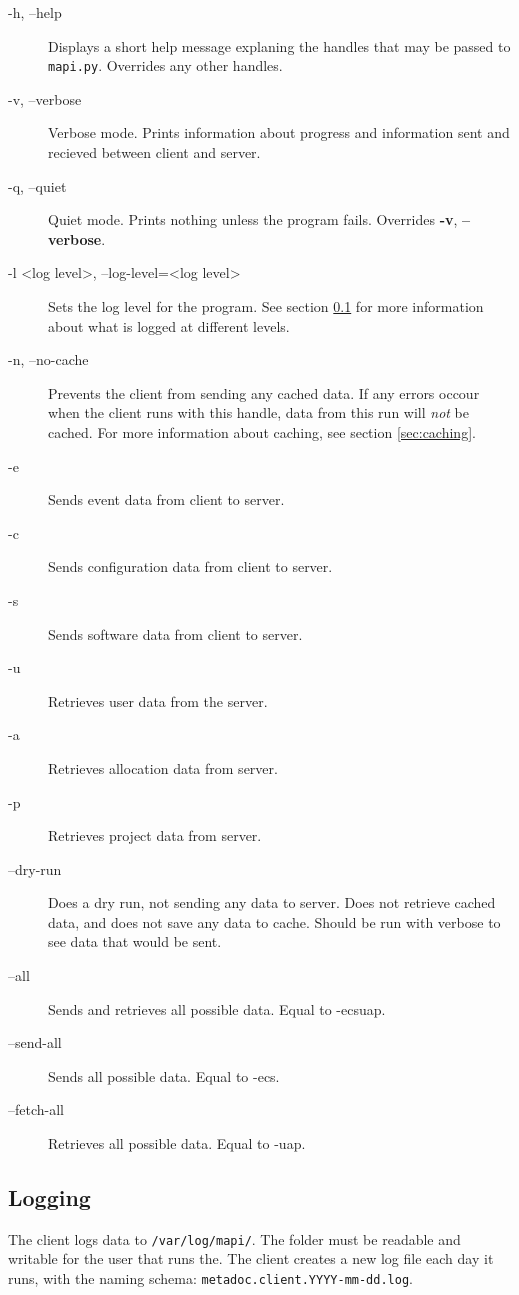 \begin{description}
    \item[-h, --help]   Displays a short help message explaning the handles
    that may be passed to \texttt{mapi.py}. Overrides any other handles.
    \item[-v, --verbose]    Verbose mode. Prints information about progress and
    information sent and recieved between client and server. 
    \item[-q, --quiet]  Quiet mode. Prints nothing unless the program fails.
    Overrides \textbf{-v}, \textbf{--verbose}.
    \item[-l \textless log level\textgreater, --log-level=\textless log
    level\textgreater] Sets the log level for the program. See section 
    \ref{sec:logging} for more information about what is logged at different 
    levels.
    \item[-n, --no-cache]   Prevents the client from sending any cached data.
    If any errors occour when the client runs with this handle, data from this
    run will \textit{not} be cached. For more information about caching, see
    section \ref{sec:caching}.
    \item[-e]   Sends event data from client to server.
    \item[-c]   Sends configuration data from client to server.
    \item[-s]   Sends software data from client to server.
    \item[-u]   Retrieves user data from the server.
    \item[-a]   Retrieves allocation data from server.
    \item[-p]   Retrieves project data from server.
    \item[--dry-run]    Does a dry run, not sending any data to server. Does
        not retrieve cached data, and does not save any data to cache.
        Should be run with verbose to see data that would be sent.
    \item[--all]    Sends and retrieves all possible data. Equal to -ecsuap.
    \item[--send-all]   Sends all possible data. Equal to -ecs.
    \item[--fetch-all]  Retrieves all possible data. Equal to -uap.
\end{description}

\subsection{Logging}
\label{sec:logging}
The client logs data to \texttt{/var/log/mapi/}. The folder must be readable
and writable for the user that runs the.  The client creates a new log file
each day it runs, with the naming schema:
\texttt{metadoc.client.YYYY-mm-dd.log}. 

